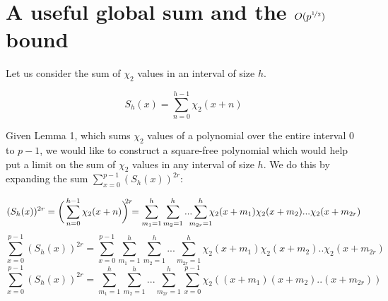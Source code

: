 \documentclass{report}
\begin{document}
\section{A useful global sum and the $O(p^{\nicefrac{1}{2}})$ bound}
Let us consider the sum of $\chi_2$ values in an interval of size $h$.

$$S_h(x)=\sum\limits_{n=0}^{h-1}\chi_2(x+n)$$

Given Lemma 1, which sums $\chi_2$ values of a polynomial over the entire interval $0$ to $p-1$, we would like to construct a square-free polynomial which would help put a limit on the sum of $\chi_2$ values in any interval of size $h$. We do this by expanding the sum $\sum\limits_{x=0}^{p-1}(S_h(x))^{2r}$:

$$(S_h(x))^{2r}= \bigg(\sum\limits_{n=0}^{h-1}\chi_2(x+n)\bigg)^{\mathclap{2r}} =\sum\limits_{m_1=1}^h\sum\limits_{m_2=1}^h...\sum\limits_{\mathclap{m_{2r}=1}}^h\chi_2(x+m_1)\chi_2(x+m_2)...\chi_2(x+m_{2r})$$
$$\sum\limits_{x=0}^{p-1}(S_h(x))^{2r}=\sum\limits_{x=0}^{p-1}\sum\limits_{m_1=1}^h\sum\limits_{m_2=1}^h...\sum\limits_{m_{2r}=1}^h\chi_2(x+m_1)\chi_2(x+m_2)..\chi_2(x+m_{2r})$$
\begin{equation} \label{sumpoly}
\sum\limits_{x=0}^{p-1}(S_h(x))^{2r}=\sum\limits_{m_1=1}^h\sum\limits_{m_2=1}^h...\sum\limits_{m_{2r}=1}^h\sum\limits_{x=0}^{p-1}\chi_2((x+m_1)(x+m_2)..(x+m_{2r}))
\end{equation}
\end{document}
